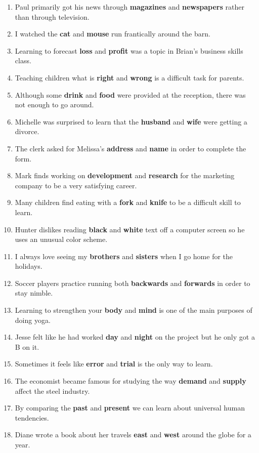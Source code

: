 \documentclass[authoryear]{elsarticle}
\begin{document}
\begin{enumerate}
\item Paul primarily got his news through \textbf{magazines} and \textbf{newspapers} rather than through television.
\item I watched the \textbf{cat} and \textbf{mouse} run frantically around the barn.
\item Learning to forecast \textbf{loss} and \textbf{profit} was a topic in Brian's business skills class.
\item Teaching children what is \textbf{right} and \textbf{wrong} is a difficult task for parents.
\item Although some \textbf{drink} and \textbf{food} were provided at the reception, there was not enough to go around.
\item Michelle was surprised to learn that the \textbf{husband} and \textbf{wife} were getting a divorce.
\item The clerk asked for Melissa's \textbf{address} and \textbf{name} in order to complete the form.
\item Mark finds working on \textbf{development} and \textbf{research} for the marketing company to be a very satisfying career.
\item Many children find eating with a \textbf{fork} and \textbf{knife} to be a difficult skill to learn.
\item Hunter dislikes reading \textbf{black} and \textbf{white} text off a computer screen so he uses an unusual color scheme.
\item I always love seeing my \textbf{brothers} and \textbf{sisters} when I go home for the holidays.
\item Soccer players practice running both \textbf{backwards} and \textbf{forwards} in order to stay nimble.
\item Learning to strengthen your \textbf{body} and \textbf{mind} is one of the main purposes of doing yoga.
\item Jesse felt like he had worked \textbf{day} and \textbf{night} on the project but he only got a B on it.
\item Sometimes it feels like \textbf{error} and \textbf{trial} is the only way to learn.
\item The economist became famous for studying the way \textbf{demand} and \textbf{supply} affect the steel industry.
\item By comparing the \textbf{past} and \textbf{present} we can learn about universal human tendencies.
\item Diane wrote a book about her travels \textbf{east} and \textbf{west} around the globe for a year.

\end{enumerate}
\end{document}
